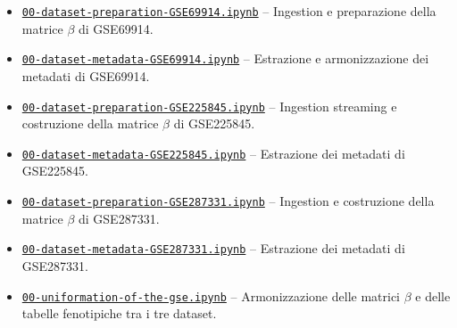 \documentclass[10pt]{extarticle}
\begin{document}
\begin{itemize}[label=-]

  \item \href{https://github.com/elisabettaroviera/THESIS/blob/main/01%20-%20Notebook/00%20-%20Dataset%20Construction%20%26%20Metadata/GSE69914/00-dataset-preparation-GSE69914.ipynb}{\texttt{00-dataset-preparation-GSE69914.ipynb}}  
  -- Ingestion e preparazione della matrice $\beta$ di GSE69914.

  \item \href{https://github.com/elisabettaroviera/THESIS/blob/main/01%20-%20Notebook/00%20-%20Dataset%20Construction%20%26%20Metadata/GSE69914/00-dataset-metadata-GSE69914.ipynb}{\texttt{00-dataset-metadata-GSE69914.ipynb}}  
  -- Estrazione e armonizzazione dei metadati di GSE69914.

  \item \href{https://github.com/elisabettaroviera/THESIS/blob/main/01%20-%20Notebook/00%20-%20Dataset%20Construction%20%26%20Metadata/GSE225845/00-dataset-preparation-GSE225845.ipynb}{\texttt{00-dataset-preparation-GSE225845.ipynb}}  
  -- Ingestion streaming e costruzione della matrice $\beta$ di GSE225845.

  \item \href{https://github.com/elisabettaroviera/THESIS/blob/main/01%20-%20Notebook/00%20-%20Dataset%20Construction%20%26%20Metadata/GSE225845/00-dataset-metadata-GSE225845.ipynb}{\texttt{00-dataset-metadata-GSE225845.ipynb}}  
  -- Estrazione dei metadati di GSE225845.

  \item \href{https://github.com/elisabettaroviera/THESIS/blob/main/01%20-%20Notebook/00%20-%20Dataset%20Construction%20%26%20Metadata/GSE287331/00-dataset-preparation-GSE287331.ipynb}{\texttt{00-dataset-preparation-GSE287331.ipynb}}  
  -- Ingestion e costruzione della matrice $\beta$ di GSE287331.

  \item \href{https://github.com/elisabettaroviera/THESIS/blob/main/01%20-%20Notebook/00%20-%20Dataset%20Construction%20%26%20Metadata/GSE287331/00-dataset-metadata-GSE287331.ipynb}{\texttt{00-dataset-metadata-GSE287331.ipynb}}  
  -- Estrazione dei metadati di GSE287331.

  \item \href{https://github.com/elisabettaroviera/THESIS/blob/main/01%20-%20Notebook/00%20-%20Dataset%20Construction%20%26%20Metadata/00-uniformation-of-the-gse.ipynb}{\texttt{00-uniformation-of-the-gse.ipynb}}  
  -- Armonizzazione delle matrici $\beta$ e delle tabelle fenotipiche tra i tre dataset.


\end{itemize}
\end{document}

